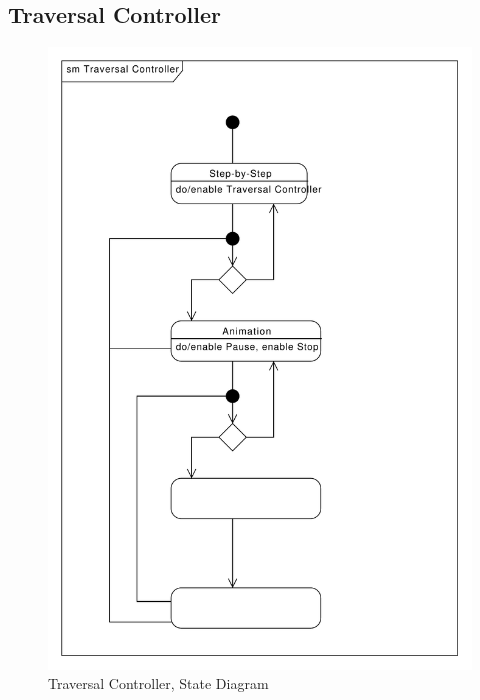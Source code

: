 \subsection{Traversal Controller}
\begin{figure}[H]
    \centering
    \includegraphics[width=\textwidth]{diagrams/sm-traversal-controller.pdf}
    \caption{Traversal Controller, State Diagram}
    \label{fig:sm-traversal-controller}
\end{figure}